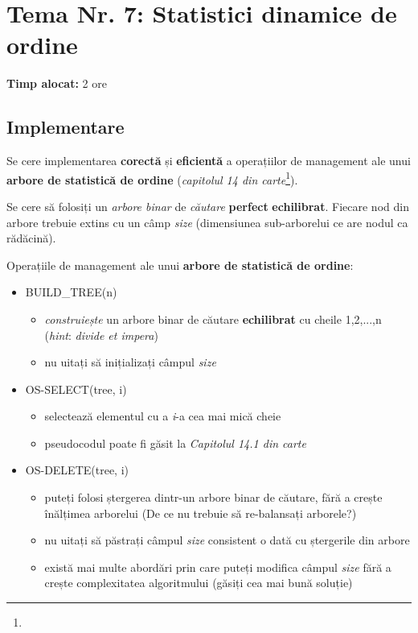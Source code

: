 \documentclass[../ro-fa-lab.tex]{subfiles}
\begin{document}
\section{\texorpdfstring{\textbf{Tema Nr. 7: Statistici dinamice de ordine}}{Tema Nr. 7: Statistici dinamice de ordine}}\label{assign7}


\textbf{Timp alocat:} 2 ore

\subsection{Implementare}\label{implementare}

Se cere implementarea \textbf{corectă} și \textbf{eficientă} a
operațiilor de management ale unui \textbf{arbore de statistică de
ordine} (\emph{capitolul 14 din carte}\footnote{}).

Se cere să folosiți un \emph{arbore binar} de \emph{căutare}
\textbf{perfect} \textbf{echilibrat}. Fiecare nod din arbore trebuie
extins cu un câmp \emph{size} (dimensiunea sub-arborelui ce are nodul ca
rădăcină).

Operațiile de management ale unui \textbf{arbore de statistică de
ordine}:

\begin{itemize}
\item
  BUILD\_TREE(n)

  \begin{itemize}
  \item
    \emph{construiește} un arbore binar de căutare \textbf{echilibrat}
    cu cheile 1,2,...,n (\emph{hint}: \emph{divide et impera})
  \item
    nu uitați să inițializați câmpul \emph{size}
  \end{itemize}
\item
  OS-SELECT(tree, i)

  \begin{itemize}
  \item
    selectează elementul cu a \emph{i}-a cea mai mică cheie
  \item
    pseudocodul poate fi găsit la \emph{Capitolul 14.1 din
    carte\citep{cormen}}
  \end{itemize}
\item
  OS-DELETE(tree, i)

  \begin{itemize}
  \item
    puteți folosi ștergerea dintr-un arbore binar de căutare, fără a
    crește înălțimea arborelui (De ce nu trebuie să re-balansați
    arborele?)
  \item
    nu uitați să păstrați câmpul \emph{size} consistent o dată cu
    ștergerile din arbore
  \item
    există mai multe abordări prin care puteți modifica câmpul
    \emph{size} fără a crește complexitatea algoritmului (găsiți cea mai
    bună soluție)
  \end{itemize}
\end{itemize}
\end{document}
